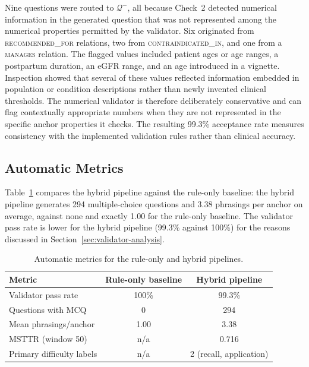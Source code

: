 Nine questions were routed to \(\mathcal{Q}^-\), all because Check~2 detected numerical information in the generated question that was not represented among the numerical properties permitted by the validator. Six originated from \textsc{recommended\_for} relations, two from \textsc{contraindicated\_in}, and one from a \textsc{manages} relation. The flagged values included patient ages or age ranges, a postpartum duration, an eGFR range, and an age introduced in a vignette. Inspection showed that several of these values reflected information embedded in population or condition descriptions rather than newly invented clinical thresholds. The numerical validator is therefore deliberately conservative and can flag contextually appropriate numbers when they are not represented in the specific anchor properties it checks. The resulting 99.3\% acceptance rate measures consistency with the implemented validation rules rather than clinical accuracy.


\subsection{Automatic Metrics}
\label{sec:exp_quality-automatic}

Table~\ref{tab:quality-auto} compares the hybrid pipeline against the rule-only
baseline: the hybrid pipeline generates 294 multiple-choice questions and 3.38
phrasings per anchor on average, against none and exactly 1.00 for the rule-only
baseline. The validator pass rate is lower for the hybrid pipeline (99.3\%
against 100\%) for the reasons discussed in Section~\ref{sec:validator-analysis}.

\begin{table}[!ht]
\centering
\small\setlength{\tabcolsep}{8pt}
\begin{tabular}{lcc}
\hline
\textbf{Metric} & \textbf{Rule-only baseline} & \textbf{Hybrid pipeline} \\
\hline
Validator pass rate     & 100\%   & 99.3\% \\
Questions with MCQ      & 0       & 294 \\
Mean phrasings/anchor   & 1.00    & 3.38 \\
MSTTR (window 50)       & n/a     & 0.716 \\
Primary difficulty labels       & n/a       & 2 (recall, application)\\
\hline
\end{tabular}
\caption{Automatic metrics for the rule-only and hybrid pipelines.}
\label{tab:quality-auto}
\end{table}


